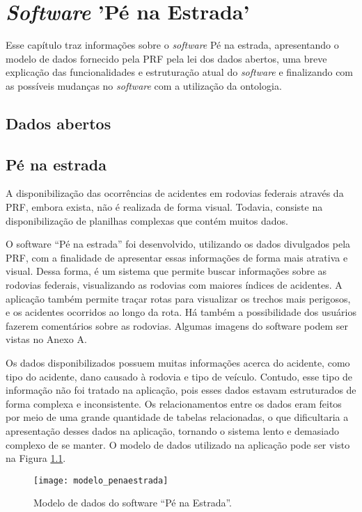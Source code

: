 \chapter{\textit{Software} 'Pé na Estrada'}
  
  Esse capítulo traz informações sobre o \textit{software} Pé na estrada, apresentando o modelo de dados fornecido pela PRF
  pela lei dos dados abertos, uma breve explicação das funcionalidades e estruturação atual do \textit{software} e finalizando 
  com as possíveis mudanças no \textit{software} com a utilização da ontologia.
  
  \section{Dados abertos}
  
    
  
  \section{Pé na estrada}
    A disponibilização das ocorrências de acidentes em rodovias federais através da PRF,
    embora exista, não é realizada de forma visual. Todavia, consiste na disponibilização de
    planilhas complexas que contém muitos dados.

    O software “Pé na estrada” foi desenvolvido, utilizando os dados divulgados pela
    PRF, com a finalidade de apresentar essas informações de forma mais atrativa e visual. Dessa
    forma, é um sistema que permite buscar informações sobre as rodovias federais, visualizando
    as rodovias com maiores índices de acidentes. A aplicação também permite traçar rotas para
    visualizar os trechos mais perigosos, e os acidentes ocorridos ao longo da rota. Há também a
    possibilidade dos usuários fazerem comentários sobre as rodovias. Algumas imagens do
    software podem ser vistas no Anexo A.

    Os dados disponibilizados possuem muitas informações acerca do acidente, como tipo
    do acidente, dano causado à rodovia e tipo de veículo. Contudo, esse tipo de informação não
    foi tratado na aplicação, pois esses dados estavam estruturados de forma complexa e
    inconsistente. Os relacionamentos entre os dados eram feitos por meio de uma grande
    quantidade de tabelas relacionadas, o que dificultaria a apresentação desses dados na
    aplicação, tornando o sistema lento e demasiado complexo de se manter. O modelo de dados
    utilizado na aplicação pode ser visto na Figura \ref{fig:modelo_penaestrada}.

    \begin{figure}[!htb]
    \centering
    \texttt{[image: modelo\_penaestrada]}
    \caption[Modelo de dados do software “Pé na Estrada”]{Modelo de dados do software “Pé na Estrada”.}
    \label{fig:modelo_penaestrada}
    \end{figure}

      
  

